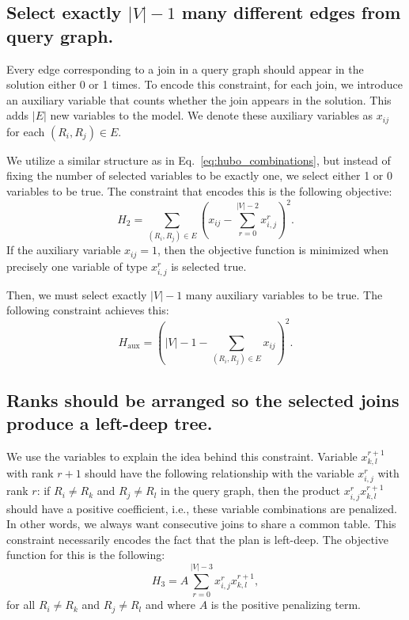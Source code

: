 \subsection{Select exactly $|V| - 1$ many different edges from query graph.}
Every edge corresponding to a join in a query graph should appear in the solution either 0 or 1 times. To encode this constraint, for each join, we introduce an auxiliary variable that counts whether the join appears in the solution. This adds $|E|$ new variables to the model. We denote these auxiliary variables as $x_{ij}$ for each $(R_i, R_j) \in E$.

We utilize a similar structure as in Eq.~\eqref{eq:hubo_combinations}, but instead of fixing the number of selected variables to be exactly one, we select either 1 or 0 variables to be true. The constraint that encodes this is the following objective:
\begin{equation}\label{eq:exactly_v1_different_joins}
    H_2 = \sum_{(R_i, R_j) \in E}\left( x_{ij} - \sum_{r = 0}^{|V| - 2}x_{i,j}^{r} \right)^2.
\end{equation}
If the auxiliary variable $x_{ij} = 1$, then the objective function is minimized when precisely one variable of type $x_{i,j}^{r}$ is selected true.

Then, we must select exactly $|V| - 1$ many auxiliary variables to be true. The following constraint achieves this:
\begin{equation}
    H_{\text{aux}} = \left( |V| - 1 - \sum_{(R_i, R_j) \in E}x_{ij} \right)^2.
\end{equation}

\subsection{Ranks should be arranged so the selected joins produce a left-deep tree.}
We use the variables to explain the idea behind this constraint. Variable $x_{k,l}^{r+1}$ with rank $r + 1$ should have the following relationship with the variable $x_{i,j}^{r}$ with rank $r$: if $R_i \neq R_k$ and $R_j \neq R_l$ in the query graph, then the product $x_{i,j}^{r}x_{k,l}^{r+1}$ should have a positive coefficient, i.e., these variable combinations are penalized. In other words, we always want consecutive joins to share a common table. This constraint necessarily encodes the fact that the plan is left-deep. The objective function for this is the following:
\begin{equation}\label{eq:connected_ranks}
    H_3 = A\sum_{r = 0}^{|V| - 3}x_{i,j}^{r}x_{k,l}^{r+1},
\end{equation}
for all $R_i \neq R_k$ and $R_j \neq R_l$ and where $A$ is the positive penalizing term.

